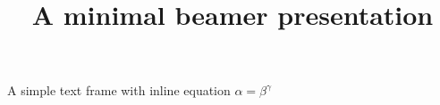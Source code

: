 \documentclass{beamer}
\begin{document}
\title{A minimal beamer presentation}

\maketitle

\begin{frame}
A simple text frame with inline equation $\alpha=\beta^\gamma$
\end{frame}

\end{document}
